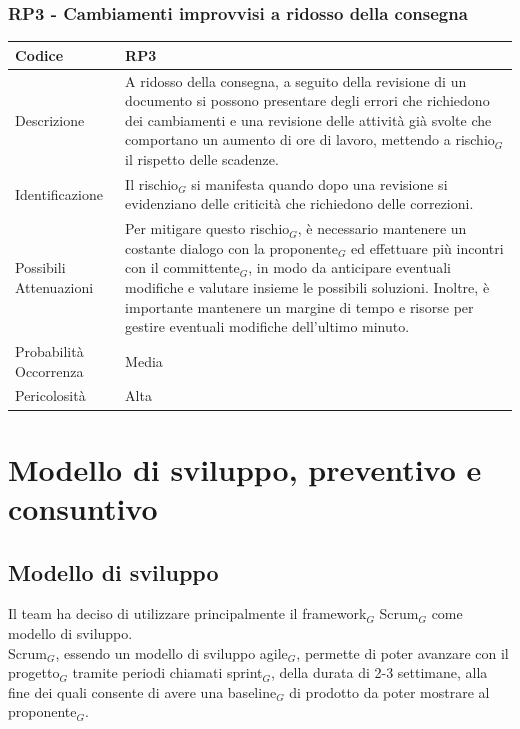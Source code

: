 \documentclass[10pt]{article}
\begin{document}
{    \subsubsection{RP3 - Cambiamenti improvvisi a ridosso della consegna}
    \label{RP3}
    \begin{tabularx}{\textwidth}{|l|X|}
    \hline
    \rowcolor{gray!25}
    Codice & RP3 \\
    \hline
    Descrizione &  A ridosso della consegna, a seguito della revisione di un documento si possono presentare degli errori che richiedono dei cambiamenti e una revisione delle attività già svolte che comportano un aumento di ore di lavoro, mettendo a rischio$_G$ il rispetto delle scadenze. \\
    \hline
    Identificazione &  Il rischio$_G$ si manifesta quando dopo una revisione si evidenziano delle criticità che richiedono delle correzioni. \\
    \hline
    Possibili Attenuazioni &  Per mitigare questo rischio$_G$, è necessario mantenere un costante dialogo con la proponente$_G$ ed effettuare più incontri con il committente$_G$, in modo da anticipare eventuali modifiche e valutare insieme le possibili soluzioni. Inoltre, è importante mantenere un margine di tempo e risorse per gestire eventuali modifiche dell'ultimo minuto. \\
    \hline
    Probabilità Occorrenza &  Media \\
    \hline
    Pericolosità & Alta \\
    \hline
    \end{tabularx}


\newpage
\section{Modello di sviluppo, preventivo e consuntivo} 
\label{modello-sviluppo}
\subsection{Modello di sviluppo}
Il team ha deciso di utilizzare principalmente il framework$_G$ Scrum$_G$ come modello di sviluppo.\\
Scrum$_G$, essendo un modello di sviluppo agile$_G$, permette di poter avanzare con il progetto$_G$ tramite periodi chiamati sprint$_G$, della durata di 2-3 settimane, alla fine dei quali consente di avere una baseline$_G$ di prodotto da poter mostrare al proponente$_G$.
}
\end{document}
